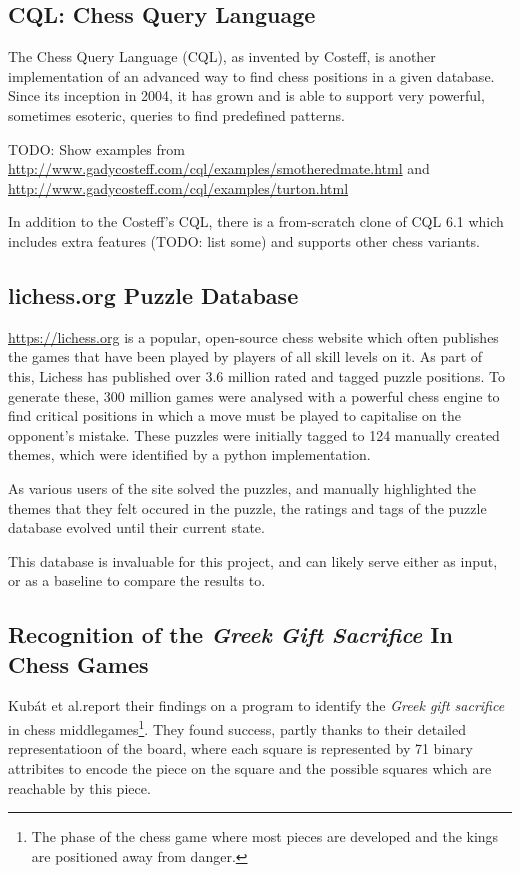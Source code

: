 \subsection{CQL: Chess Query Language}

The Chess Query Language (CQL), as invented by Costeff,\cite{cql} is another
implementation of an advanced way to find chess positions in a given database.
Since its inception in 2004, it has grown and is able to support very powerful,
sometimes esoteric, queries to find predefined patterns.

TODO: Show examples from
\url{http://www.gadycosteff.com/cql/examples/smotheredmate.html} and
\url{http://www.gadycosteff.com/cql/examples/turton.html}

In addition to the Costeff's CQL, there is a from-scratch clone of CQL 6.1
which includes extra features (TODO: list some) and supports other chess
variants.\cite{cqli}

\subsection{lichess.org Puzzle Database}

\url{https://lichess.org} is a popular, open-source chess website which often
publishes the games that have been played by players of all skill levels on it.
As part of this, Lichess has published over 3.6 million rated and tagged puzzle
positions.\cite{lichessPuzzles} To generate these, 300 million games were
analysed with a powerful chess engine to find critical positions in which a
move must be played to capitalise on the opponent's mistake. These puzzles were
initially tagged to 124 manually created themes,\cite{lichessXML} which were
identified by a python implementation.\cite{lichessTagger} 

As various users of the site solved the puzzles, and manually highlighted the
themes that they felt occured in the puzzle, the ratings and tags of the puzzle
database evolved until their current state.

This database is invaluable for this project, and can likely serve either as
input, or as a baseline to compare the results to.

\subsection{Recognition of the \emph{Greek Gift Sacrifice} In Chess Games}

Kub\'{a}t et al.\@ report their findings on a program \cite{middlegamePatterns}
to identify the \emph{Greek gift sacrifice} in chess middlegames\footnote{The
phase of the chess game where most pieces are developed and the kings are
positioned away from danger.}. They found success, partly thanks to their
detailed representatioon of the board, where each square is represented by 71
binary attribites \cite{middlegamePatterns} to encode the piece on the square
and the possible squares which are reachable by this piece. 

